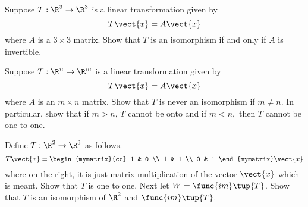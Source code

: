 \begin{enumialphparenastyle}
\begin{ex} Suppose $T:\R^{3}\rightarrow \R^{3}$ is a linear
transformation given by 
\begin{equation*}
T\vect{x}=A\vect{x}
\end{equation*}
where $A$ is a $3\times 3$ matrix. Show that $T$ is an isomorphism if and
only if $A$ is invertible.
\end{ex}


\begin{ex} Suppose $T:\R^{n}\rightarrow \R^{m}$ is a linear
transformation given by 
\begin{equation*}
T\vect{x}=A\vect{x}
\end{equation*}
where $A$ is an $m\times n$ matrix. Show that $T$ is never an isomorphism if 
$m\neq n$. In particular, show that if $m>n$, $T$ cannot be onto and if $
m<n, $ then $T$ cannot be one to one.
\end{ex}


\begin{ex} Define $T:\R^{2}\rightarrow \R^{3}$ as follows. 
\begin{equation*}
T\vect{x}=\begin{mymatrix}{cc}
1 & 0 \\ 
1 & 1 \\ 
0 & 1
\end{mymatrix} \vect{x}
\end{equation*}
where on the right, it is just matrix multiplication of the vector $\vect{x}$
which is meant. Show that $T$ is one to one. Next let $W=\func{im}\tup{
T} $. Show that $T$ is an isomorphism of $\R^{2}$ and $\func{im
}\tup{T} $.
\end{ex}



\end{enumialphparenastyle}

